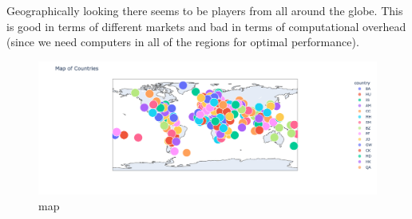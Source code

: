 \begin{landscape}
Geographically looking there seems to be players from all around the globe. This is good in terms of different markets and bad in terms of computational overhead (since we need computers in all of the regions for optimal performance).

    \begin{figure}[H]
        \includegraphics[scale=0.65]{img/Graphs/users/map.png}
        \centering
        \caption{map}
        \label{fig:map}
    \end{figure}
\end{landscape}